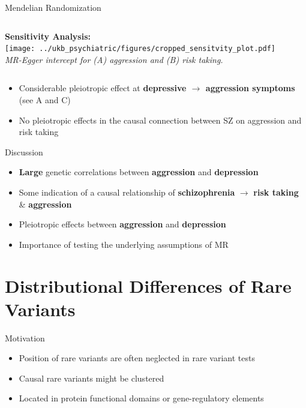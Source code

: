 \documentclass{beamer}
\begin{document}
\begin{frame}[t]{Mendelian Randomization}
\begin{columns}[T]
\begin{column}[T]{0.5\textwidth}
      \textbf{Sensitivity Analysis:}\\
      \texttt{[image: ../ukb\_psychiatric/figures/cropped\_sensitvity\_plot.pdf]} \\
      \textit{MR-Egger intercept for (A) aggression and (B) risk taking.}
    \end{column}
  \end{columns}
      \begin{itemize}
        \item Considerable pleiotropic effect at \textbf{depressive $\rightarrow$ aggression symptoms} (see A and C)
        \item No pleiotropic effects in the causal connection between SZ on aggression and risk taking 
      \end{itemize}
\end{frame}

\begin{frame}[t]{Discussion}
  \begin{itemize}
    \item \textbf{Large} genetic correlations between \textbf{aggression} and \textbf{depression}
    \item Some indication of a causal relationship of \textbf{schizophrenia} $\rightarrow$ \textbf{risk taking} \& \textbf{aggression}
    \item Pleiotropic effects between \textbf{aggression} and \textbf{depression} 
    \item Importance of testing the underlying assumptions of MR
  \end{itemize} 
\end{frame}

\section{Distributional Differences of Rare Variants}

\begin{frame}[t]{Motivation}
  \begin{itemize}
    \item Position of rare variants are often neglected in rare variant tests
    \item Causal rare variants might be clustered
    \item Located in protein functional domains or gene-regulatory elements
  \end{itemize} 
  
\end{frame}
\end{document}
